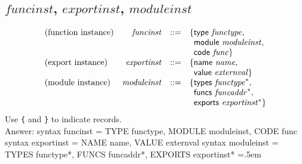 \documentclass{article}
\newenvironment{lcverbatim}
 {\SaveVerbatim{cverb}}
 {\endSaveVerbatim
  \flushleft\fboxrule=0pt\fboxsep=.5em
  \colorbox{cverbbg}{%
    \makebox[\dimexpr\linewidth-2\fboxsep][l]{\BUseVerbatim{cverb}}%
  }
  \endflushleft
}
\newcommand\K[1]{\texttt{#1}}
\begin{document}
\subsection{$funcinst$, $exportinst$, $moduleinst$}
$$
\begin{array}{@{}lrrl@{}l@{}}
	\mbox{(function instance)} & {\mathit{funcinst}} &::=& \{ \begin{array}[t]{@{}l@{}l@{}}
		\mathsf{type}~{\mathit{functype}},\; \\
		\mathsf{module}~{\mathit{moduleinst}},\; \\
		\mathsf{code}~{\mathit{func}} \}\end{array} \\
	\mbox{(export instance)} & {\mathit{exportinst}} &::=& \{ \begin{array}[t]{@{}l@{}l@{}}
		\mathsf{name}~{\mathit{name}},\; \\
		\mathsf{value}~{\mathit{externval}} \}\end{array} \\
	\mbox{(module instance)} & {\mathit{moduleinst}} &::=& \{ \begin{array}[t]{@{}l@{}l@{}}
		\mathsf{types}~{{\mathit{functype}}^\ast},\; \\
		\mathsf{funcs}~{{\mathit{funcaddr}}^\ast},\; \\
		\mathsf{exports}~{{\mathit{exportinst}}^\ast} \}\end{array} \\
\end{array}
$$
Use \K{\{} and \K{\}} to indicate records. \\
{\color{red}
	Answer:
	\begin{lcverbatim}
syntax funcinst =
  { TYPE functype,
    MODULE moduleinst,
    CODE func }
syntax exportinst =
  { NAME name,
    VALUE externval }
syntax moduleinst =
  { TYPES functype*,
    FUNCS funcaddr*,
    EXPORTS exportinst* }
	\end{lcverbatim}
}
\end{document}
